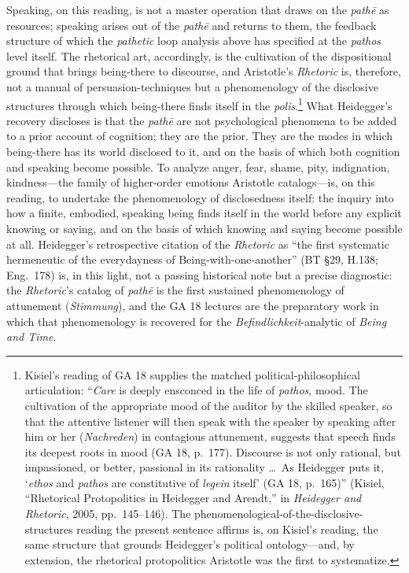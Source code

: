 Speaking, on this reading, is not a master operation that draws on the \textit{pathē} as resources; speaking arises out of the \textit{pathē} and returns to them, the feedback structure of which the \textit{pathetic} loop analysis above has specified at the \textit{pathos} level itself. The rhetorical art, accordingly, is the cultivation of the dispositional ground that brings being-there to discourse, and Aristotle's \textit{Rhetoric} is, therefore, not a manual of persuasion-techniques but a phenomenology of the disclosive structures through which being-there finds itself in the \textit{polis}.\footnote{Kisiel's reading of GA 18 supplies the matched political-philosophical articulation: ``\textit{Care} is deeply ensconced in the life of \textit{pathos}, mood. The cultivation of the appropriate mood of the auditor by the skilled speaker, so that the attentive listener will then speak with the speaker by speaking after him or her (\textit{Nachreden}) in contagious attunement, suggests that speech finds its deepest roots in mood (GA 18, p.~177). Discourse is not only rational, but impassioned, or better, passional in its rationality \ldots\ As Heidegger puts it, `\textit{ethos} and \textit{pathos} are constitutive of \textit{legein} itself' (GA 18, p.~165)'' (Kisiel, ``Rhetorical Protopolitics in Heidegger and Arendt,'' in \textit{Heidegger and Rhetoric}, 2005, pp.~145--146). The phenomenological-of-the-disclosive-structures reading the present sentence affirms is, on Kisiel's reading, the same structure that grounds Heidegger's political ontology---and, by extension, the rhetorical protopolitics Aristotle was the first to systematize.} What Heidegger's recovery discloses is that the \textit{pathē} are not psychological phenomena to be added to a prior account of cognition; they are the prior. They are the modes in which being-there has its world disclosed to it, and on the basis of which both cognition and speaking become possible. To analyze anger, fear, shame, pity, indignation, kindness---the family of higher-order emotions Aristotle catalogs---is, on this reading, to undertake the phenomenology of disclosedness itself: the inquiry into how a finite, embodied, speaking being finds itself in the world before any explicit knowing or saying, and on the basis of which knowing and saying become possible at all. Heidegger's retrospective citation of the \textit{Rhetoric} as ``the first systematic hermeneutic of the everydayness of Being-with-one-another'' (BT \S29, H.138; Eng.~178) is, in this light, not a passing historical note but a precise diagnostic: the \textit{Rhetoric}'s catalog of \textit{pathē} is the first sustained phenomenology of attunement (\textit{Stimmung}), and the GA 18 lectures are the preparatory work in which that phenomenology is recovered for the \textit{Befindlichkeit}-analytic of \textit{Being and Time}.

